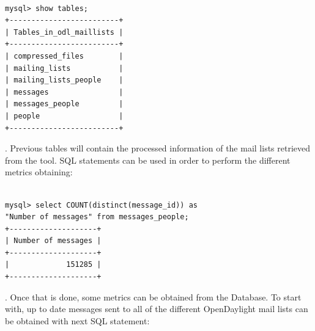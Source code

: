 \documentclass[a4paper, 12pt]{book}
\begin{document}
\begin{verbatim}

mysql> show tables;
+-------------------------+
| Tables_in_odl_maillists |
+-------------------------+
| compressed_files        |
| mailing_lists           |
| mailing_lists_people    |
| messages                |
| messages_people         |
| people                  |
+-------------------------+

\end{verbatim}
. Previous tables will contain the processed information of the mail lists retrieved from the tool. SQL statements can be used in order to perform the different metrics obtaining:

\begin{verbatim}

mysql> select COUNT(distinct(message_id)) as
"Number of messages" from messages_people;
+--------------------+
| Number of messages |
+--------------------+
|             151285 |
+--------------------+

\end{verbatim}
. Once that is done, some metrics can be obtained from the Database. To start with, up to date messages sent to all of the different OpenDaylight mail lists can be obtained with next SQL statement:
\end{document}
